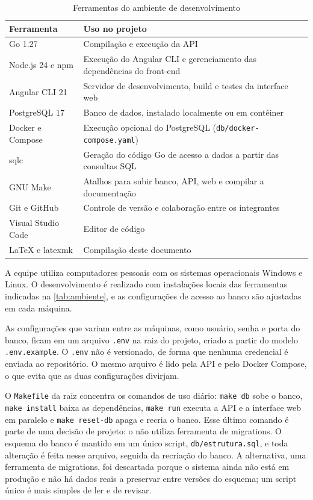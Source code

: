 \begin{table}[htbp]
  \centering
  \caption{Ferramentas do ambiente de desenvolvimento}
  \label{tab:ambiente}
  \begin{tabularx}{\textwidth}{lX}
    \toprule
    \textbf{Ferramenta} & \textbf{Uso no projeto} \\
    \midrule
    Go 1.27              & Compilação e execução da API \\
    Node.js 24 e npm     & Execução do Angular CLI e gerenciamento das dependências do front-end \\
    Angular CLI 21       & Servidor de desenvolvimento, build e testes da interface web \\
    PostgreSQL 17        & Banco de dados, instalado localmente ou em contêiner \\
    Docker e Compose     & Execução opcional do PostgreSQL (\texttt{db/docker-compose.yaml}) \\
    sqlc                 & Geração do código Go de acesso a dados a partir das consultas SQL \\
    GNU Make             & Atalhos para subir banco, API, web e compilar a documentação \\
    Git e GitHub         & Controle de versão e colaboração entre os integrantes \\
    Visual Studio Code   & Editor de código \\
    \LaTeX{} e latexmk   & Compilação deste documento \\
    \bottomrule
  \end{tabularx}
\end{table}

A equipe utiliza computadores pessoais com os sistemas operacionais Windows e Linux. O desenvolvimento é realizado com instalações locais das ferramentas indicadas na \autoref{tab:ambiente}, e as configurações de acesso ao banco são ajustadas em cada máquina.

As configurações que variam entre as máquinas, como usuário, senha e porta do banco, ficam em um arquivo \texttt{.env} na raiz do projeto, criado a partir do modelo \texttt{.env.example}. O \texttt{.env} não é versionado, de forma que nenhuma credencial é enviada ao repositório. O mesmo arquivo é lido pela API e pelo Docker Compose, o que evita que as duas configurações divirjam.

O \texttt{Makefile} da raiz concentra os comandos de uso diário: \texttt{make db} sobe o banco, \texttt{make install} baixa as dependências, \texttt{make run} executa a API e a interface web em paralelo e \texttt{make reset-db} apaga e recria o banco. Esse último comando é parte de uma decisão de projeto: o \sistema{} não utiliza ferramenta de migrations. O esquema do banco é mantido em um único script, \texttt{db/estrutura.sql}, e toda alteração é feita nesse arquivo, seguida da recriação do banco. A alternativa, uma ferramenta de migrations, foi descartada porque o sistema ainda não está em produção e não há dados reais a preservar entre versões do esquema; um script único é mais simples de ler e de revisar.

